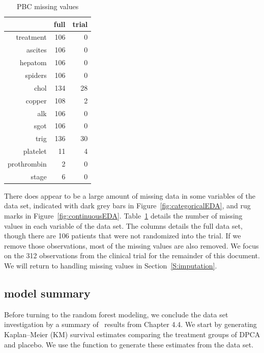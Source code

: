 \documentclass[nojss]{jss}\usepackage[]{graphicx}\usepackage[]{color}
\begin{document}
\begin{table}[ht]
\centering
{\footnotesize
\begin{tabular}{rrr}
  \toprule
 & full & trial \\ 
  \midrule
treatment &  106 &    0 \\ 
   \rowcolor[gray]{0.95}ascites &  106 &    0 \\ 
  hepatom &  106 &    0 \\ 
   \rowcolor[gray]{0.95}spiders &  106 &    0 \\ 
  chol &  134 &   28 \\ 
   \rowcolor[gray]{0.95}copper &  108 &    2 \\ 
  alk &  106 &    0 \\ 
   \rowcolor[gray]{0.95}sgot &  106 &    0 \\ 
  trig &  136 &   30 \\ 
   \rowcolor[gray]{0.95}platelet &   11 &    4 \\ 
  prothrombin &    2 &    0 \\ 
   \rowcolor[gray]{0.95}stage &    6 &    0 \\ 
   \bottomrule
\end{tabular}
}
\caption{PBC missing values} 
\label{T:missing}
\end{table}


There does appear to be a large amount of missing data in some variables of the  data set, indicated with dark grey bars in Figure~\ref{fig:categoricalEDA}, and rug marks in Figure~\ref{fig:continuousEDA}. Table~\ref{T:missing} details the number of missing values in each variable of the  data set. The  columns details the full data set, though there are 106 patients that were not randomized into the trial. If we remove those observations, most of the missing values are also removed. We focus on the 312 observations from the clinical trial for the remainder of this document. We will return to handling missing values in Section~\ref{S:imputation}.


\subsection[Model Summary]{\cite{fleming:1991} model summary}
Before turning to the random forest modeling, we conclude the data set investigation by a summary of~\cite{fleming:1991} results from Chapter 4.4. We start by generating Kaplan--Meier (KM) survival estimates comparing the treatment groups of DPCA and placebo. We use the   function to generate these estimates from the data set. 
\end{document}
